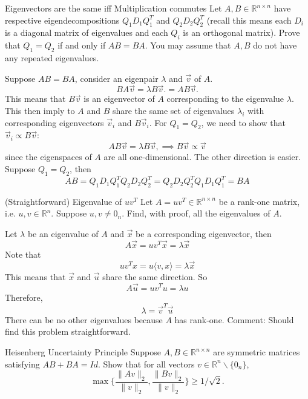 \documentclass[../main]{subfiles}
\begin{document}
\begin{bbox}{Eigenvectors are the same iff Multiplication commutes}
    Let $A,B\in \mathbb R^{n\times n}$ have respective eigendecompositions $Q_1 D_1Q_1^T$ and $Q_2 D_2 Q_2^T$ (recall this means each $D_i$ is a diagonal matrix of eigenvalues and each $Q_i$ is an orthogonal matrix). Prove that $Q_1 = Q_2$ if and only if $AB = BA$. You may assume that $A, B$ do not have any repeated eigenvalues.
\end{bbox}
\begin{solution}
    Suppose $AB = BA$, consider an eigenpair $\lambda$ and $\vec v$ of $A$. 
    \[
    BA \vec v = \lambda B\vec v. = AB\vec v.
    \]
    This means that $B\vec v$ is an eigenvector of $A$ corresponding to the eigenvalue $\lambda$. This then imply to $A$ and $B$ share the same set of eigenvalues $\lambda_i$ with corresponding eigenvectors $\vec v_i$ and $B\vec v_i$. For $Q_1 = Q_2$, we need to show that $\vec v_i \propto B\vec v$: 
    \[
    A B\vec v = \lambda B\vec v, \implies B\vec v \propto \vec v
    \] since the eigenspaces of $A$ are all one-dimensional.
    \newline
    The other direction is easier. Suppose $Q_1 = Q_2$, then 
    \[
    AB = Q_1 D_1 Q_1^T Q_2 D_2 Q_2^T = Q_2 D_2 Q_2^TQ_1 D_1 Q_1^T = BA
    \]
\end{solution}
\begin{bbox}{(Straightforward) Eigenvalue of $uv^T$}
    Let $A = uv^T \in \mathbb R^{n\times n}$ be a rank-one matrix, i.e. $u, v \in \mathbb R^n$. Suppose $u,v \neq 0_n$. Find, with proof, all the eigenvalues of $A$.
\end{bbox}
\begin{solution}
    Let $\lambda$ be an eigenvalue of $A$ and $\vec x$ be a corresponding eigenvector, then 
    \[
    A \vec x= uv^T \vec x = \lambda \vec x 
    \]
    Note that 
    \[ 
    u v^T x = u \langle v, x\rangle = \lambda \vec x
    \]
    This means that $\vec x$ and $\vec u$ share the same direction. So 
    \[
    A \vec u = u v^T u = \lambda u
    \]
    Therefore, 
    \[
    \lambda = \vec v^T \vec u
    \]
    There can be no other eigenvalues because $A$ has rank-one.
    \newline
    Comment: Should find this problem straightforward.
\end{solution}
\begin{bbox}{Heisenberg Uncertainty Principle}
    Suppose $A, B \in \mathbb R^{n\times n}$ are symmetric matrices satisfying $AB + BA = Id$. Show that for all vectors $v\in \mathbb R^n\backslash\{0_n\}$,
    \[
    \max \{\frac{\|Av\|_2}{\|v\|_2}, \frac{\|Bv\|_2}{\|v\|_2}\} \geq 1/\sqrt{2}.
    \]
\end{bbox}
\end{document}
